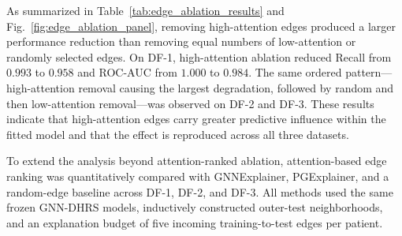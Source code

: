 \documentclass[pdflatex,sn-mathphys-num]{sn-jnl}%
\theoremstyle{thmstyleone}%
\theoremstyle{thmstyletwo}%
\theoremstyle{thmstylethree}%
\begin{document}
 {
As summarized in Table~\ref{tab:edge_ablation_results} and
Fig.~\ref{fig:edge_ablation_panel}, removing high-attention edges produced a
larger performance reduction than removing equal numbers of low-attention or
randomly selected edges. On DF-1, high-attention ablation reduced Recall from
\(0.993\) to \(0.958\) and ROC-AUC from \(1.000\) to \(0.984\). The same
ordered pattern—high-attention removal causing the largest degradation,
followed by random and then low-attention removal—was observed on DF-2 and
DF-3. These results indicate that high-attention edges carry greater
predictive influence within the fitted model and that the effect is
reproduced across all three datasets.
}

To extend the analysis beyond attention-ranked ablation, attention-based edge
ranking was quantitatively compared with GNNExplainer, PGExplainer, and a
random-edge baseline across DF-1, DF-2, and DF-3. All methods used the same
frozen GNN-DHRS models, inductively constructed outer-test neighborhoods, and
an explanation budget of five incoming training-to-test edges per patient.
\end{document}
